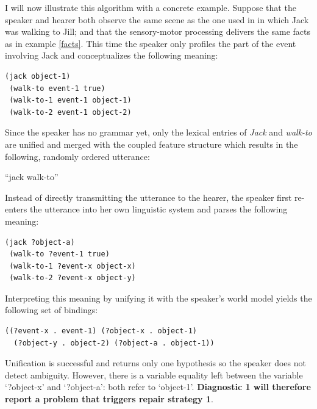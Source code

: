 I will now illustrate this algorithm with a concrete example. Suppose that the speaker and hearer both observe the same scene as the one used in  in which Jack was walking to Jill; and that the sensory-motor processing delivers the same facts as in example \ref{facts}. This time the speaker only profiles the part of the event involving Jack and conceptualizes the following meaning:

\ea
\begin{lstlisting}
(jack object-1)
 (walk-to event-1 true)
 (walk-to-1 event-1 object-1)
 (walk-to-2 event-1 object-2)
\end{lstlisting}
\z

Since the speaker has no grammar yet, only the lexical entries of {\em Jack} and {\em walk-to} are unified and merged with the coupled feature structure which results in the following, randomly ordered utterance:

\ea
``jack walk-to''
\z

Instead of directly transmitting the utterance to the hearer, the speaker first re-enters the utterance into her own linguistic system and parses the following meaning:

\ea
\begin{lstlisting}
(jack ?object-a)
 (walk-to ?event-1 true)
 (walk-to-1 ?event-x object-x)
 (walk-to-2 ?event-x object-y)
\end{lstlisting}
\z

Interpreting this meaning by unifying it with the speaker's world model yields the following set of bindings:

\ea
\begin{lstlisting}
((?event-x . event-1) (?object-x . object-1)
  (?object-y . object-2) (?object-a . object-1))
\end{lstlisting}
\z

Unification is successful and returns only one hypothesis so the speaker does not detect ambiguity. However, there is a variable equality left between the variable `?object-x' and `?object-a': both refer to `object-1'. {\bfseries Diagnostic 1 will therefore report a problem that triggers repair strategy 1}.

